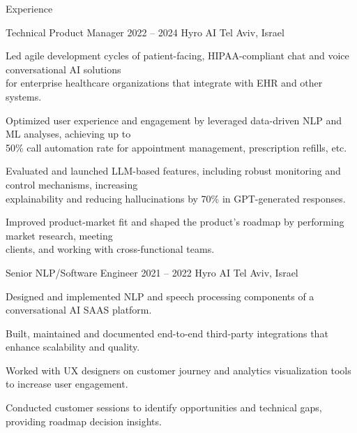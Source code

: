 \documentclass{resume} %
\begin{document}
\begin{rSection}{Experience}

\begin{rSubsection}
	{Technical Product Manager}
	{2022 -- 2024}
	{Hyro AI}
	{Tel Aviv, Israel}

	\setlength{\itemindent}{.5cm}
	
	
	
	\item Led agile development cycles of patient-facing, HIPAA-compliant chat and voice conversational AI solutions\\\hspace*{.5cm}for enterprise healthcare organizations that integrate with EHR and other systems.
	\item Optimized user experience and engagement by leveraged data-driven NLP and ML analyses, achieving up to \\\hspace*{.5cm}50\% call automation rate for appointment management, prescription refills, etc.
	\item Evaluated and launched LLM-based features, including robust monitoring and control mechanisms, increasing\\\hspace*{.5cm}explainability and reducing hallucinations by 70\% in GPT-generated responses.
	\item Improved product-market fit and shaped the product's roadmap by performing market research, meeting\\\hspace*{.5cm}clients, and working with cross-functional teams.
\end{rSubsection}

\begin{rSubsection}
	{Senior NLP/Software Engineer}
	{2021 -- 2022}
	{Hyro AI}
	{Tel Aviv, Israel}
	
	\setlength{\itemindent}{.5cm}
	
	\item Designed and implemented NLP and speech processing components of a conversational AI SAAS platform.
	\item Built, maintained and documented end-to-end third-party integrations that enhance scalability and quality.
	\item Worked with UX designers on customer journey and analytics visualization tools to increase user engagement.
	\item Conducted customer sessions to identify opportunities and technical gaps, providing roadmap decision insights.
\end{rSubsection}


\end{rSection}
\end{document}
